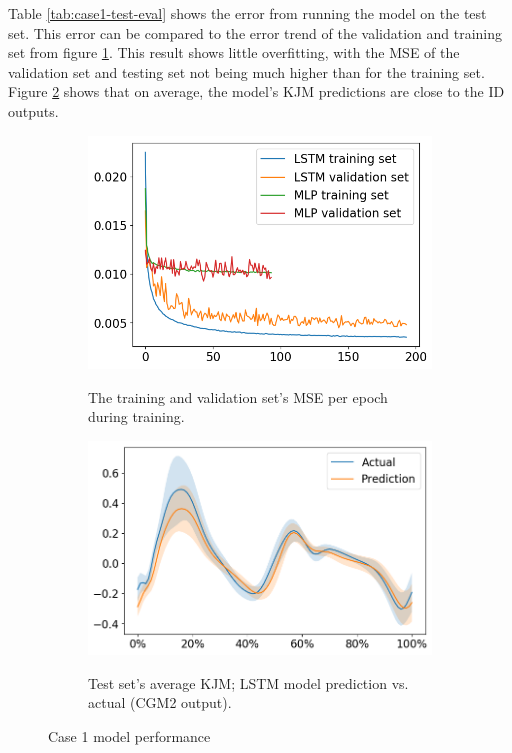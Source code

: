 \documentclass[../main.tex]{subfiles}
\begin{document}
Table \ref{tab:case1-test-eval} shows the error from running the model on the test set.
This error can be compared to the error trend of the validation and training set from figure \ref{fig:case1-training-performance}.
This result shows little overfitting, with the \ac{MSE} of the validation set and testing set not being much higher than for the training set.
Figure \ref{fig:case1-prediction-performance} shows that on average, the model's \ac{KJM} predictions are close to the \ac{ID} outputs.
\begin{figure}[!htb]
    \captionsetup[subfigure]{aboveskip=-12pt}
     \centering
     \begin{subfigure}[b]{0.475\textwidth}
         \centering
         \includegraphics[width=\textwidth]{img/results/training_history/Case1_LSTMvsMLP_training.png}
         \label{fig:case1-training-performance}
         \caption{The training and validation set's \ac{MSE} per epoch during training.}
     \end{subfigure}
     \hfill
     \begin{subfigure}[b]{0.515\textwidth}
         \centering
         \includegraphics[width=\textwidth]{img/results/test_prediction_evaluation/Case1_LSTM_test_prediction.png}
         \label{fig:case1-prediction-performance}
         \caption{Test set's average \ac{KJM}; LSTM model prediction vs. actual (CGM2 output).}
     \end{subfigure}
    \caption{Case 1 model performance}
    \label{fig:case1-performance-plots}
\end{figure}

\end{document}
